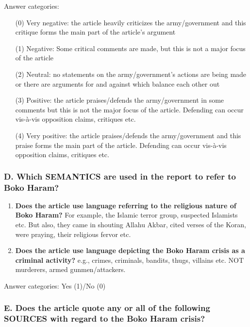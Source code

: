 \noindent Answer categories:
\begin{enumerate}[noitemsep, nolistsep, font=\bfseries]
    \item[(0)] Very negative: the article heavily criticizes the army/government and this critique forms the main part of the article’s argument
    \item[(1)] Negative: Some critical comments are made, but this is not a major focus of the article
    \item[(2)] Neutral: no statements on the army/government’s actions are being made or there are arguments for and against which balance each other out
    \item[(3)] Positive: the article praises/defends the army/government in some comments but this is not the major focus of the article. Defending can occur vis-à-vis opposition claims, critiques etc.
    \item[(4)] Very positive: the article praises/defends the army/government and this praise forms the main part of the article. Defending can occur vis-à-vis opposition claims, critiques etc.
\end{enumerate}


\subsubsection{D.	Which SEMANTICS are used in the report to refer to Boko Haram?}


\begin{enumerate}[noitemsep, font=\bfseries]
    \item \textbf{Does the article use language referring to the religious  nature of Boko Haram?} For example, the Islamic terror group, suspected Islamists etc. But also, they came in shouting Allahu Akbar, cited verses of the Koran, were praying, their religious fervor etc.
    \item \textbf{Does the article use language depicting the Boko Haram crisis as a criminal activity?} e.g., crimes, criminals, bandits, thugs, villains etc. NOT murderers, armed gunmen/attackers.
\end{enumerate}

Answer categories: Yes (1)/No (0)

\subsubsection{E.	Does the article quote any or all of the following SOURCES with regard to the Boko Haram crisis? }


